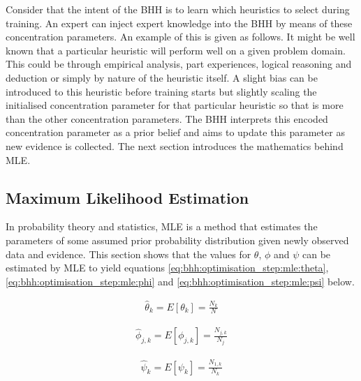 Consider that the intent of the \ac{BHH} is to learn which heuristics to select during training. An expert can inject expert knowledge into the \ac{BHH} by means of these concentration parameters. An example of this is given as follows. It might be well known that a particular heuristic will perform well on a given problem domain. This could be through empirical analysis, part experiences, logical reasoning and deduction or simply by nature of the heuristic itself. A slight bias can be introduced to this heuristic before training starts but slightly scaling the initialised concentration parameter for that particular heuristic so that is more than the other concentration parameters. The \ac{BHH} interprets this encoded concentration parameter as a prior belief and aims to update this parameter as new evidence is collected. The next section introduces the mathematics behind \ac{MLE}.

\subsection{Maximum Likelihood Estimation}
\label{sec:bhh:optimisation_step:mle}

In probability theory and statistics, \ac{MLE} is a method that estimates the parameters of some assumed prior probability distribution given newly observed data and evidence. This section shows that the values for $\theta$, $\phi$ and $\psi$ can be estimated by \ac{MLE} to yield equations \ref{eq:bhh:optimisation_step:mle:theta}, \ref{eq:bhh:optimisation_step:mle:phi} and \ref{eq:bhh:optimisation_step:mle:psi} below.

\begin{equation}
      \label{eq:bhh:optimisation_step:mle:theta}
      \begin{split}
            \hat{\theta}_{k} = E[\theta_{k}] = \frac{N_{k}}{N}
      \end{split}
\end{equation}

\begin{equation}
      \label{eq:bhh:optimisation_step:mle:phi}
      \begin{split}
            \hat{\phi}_{j,k} = E[\phi_{j,k}] = \frac{N_{j,k}}{N_{j}}
      \end{split}
\end{equation}

\begin{equation}
      \label{eq:bhh:optimisation_step:mle:psi}
      \begin{split}
            \hat{\psi}_{k} = E[\psi_{k}] = \frac{N_{1,k}}{N_{k}}
      \end{split}
\end{equation}


